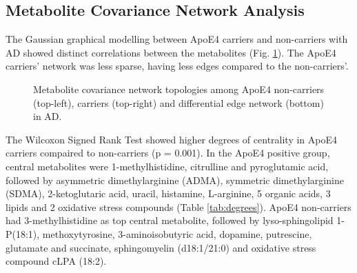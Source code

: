 \documentclass{amsart}
\begin{document}
\subsection{Metabolite Covariance Network Analysis}
The Gaussian graphical modelling between ApoE4 carriers and non-carriers with AD showed distinct correlations between the metabolites (Fig. \ref{netAD}). The ApoE4 carriers' network was less sparse, having less edges compared to the non-carriers'. 
\begin{figure}[!hb]
\centerline{}
\caption{\label{netAD} Metabolite covariance network topologies among ApoE4 non-carriers (top-left), carriers (top-right) and differential edge network (bottom) in AD.}  
\end{figure}

The Wilcoxon Signed Rank Test showed higher degrees of centrality in ApoE4 carriers compaired to non-carriers (p = 0.001). In the ApoE4 positive group, central metabolites were 1-methylhistidine, citrulline and pyroglutamic acid, followed by asymmetric dimethylarginine (ADMA), symmetric dimethylarginine (SDMA), 2-ketoglutaric acid, uracil, histamine, L-arginine, 5 organic acids, 3 lipids and 2 oxidative stress compounds (Table \ref{tab:degrees}). ApoE4 non-carriers had 3-methylhistidine as top central metabolite, followed by lyso-sphingolipid 1-P(18:1), methoxytyrosine, 3-aminoisobutyric acid, dopamine, putrescine, glutamate and succinate, sphingomyelin (d18:1/21:0) and oxidative stress compound cLPA (18:2).
\end{document}
